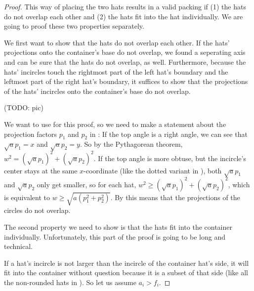 \documentclass[a4paper,style=print,oneside,bibliography=totoc,nexus,lnum,extramargin]{tubsbook}
\begin{document}
\begin{proof}
    This way of placing the two hats results in a valid packing if (1) the hats do not overlap each other and (2) the hats fit into the hat individually. We are going to proof these two properties separately.

    We first want to show that the hats do not overlap each other. If the hats' projections onto the container's base do not overlap, we found a seperating axis and can be sure that the hats do not overlap, as well. Furthermore, because the hats' incircles touch the rightmost part of the left hat's boundary and the leftmost part of the right hat's boundary, it suffices to show that the projections of the hats' incircles onto the container's base do not overlap.

    (TODO: pic)

    We want to use  for this proof, so we need to make a statement about the projection factors $p_1$ and $p_2$ in : If the top angle is a right angle, we can see that $\sqrt{a}p_1 = x$ and $\sqrt{a}p_2 = y$. So by the Pythagorean theorem, $w^2 = (\sqrt{a}p_1)^2 + (\sqrt{a}p_2)^2$.
     If the top angle is more obtuse, but the incircle's center stays at the same $x$-coordinate (like the dotted variant in ),
    both $\sqrt{a}p_1$ and $\sqrt{a}p_2$ only get smaller, so for each hat, $w^2 \ge (\sqrt{a}p_1)^2 + (\sqrt{a}p_2)^2$, which is equivalent to $w \ge \sqrt{a(p_1^2+p_2^2)}$.
    By  this means that the projections of the circles do not overlap.


    The second property we need to show is that the hats fit into the container individually. Unfortunately, this part of the proof is going to be long and technical.

    If a hat's incircle is not larger than the incircle of the container hat's side, it will fit into the container without question because it is a subset of that side (like all the non-rounded hats in ).
    So let us assume $a_i > f_i$.


\end{proof}
\end{document}
